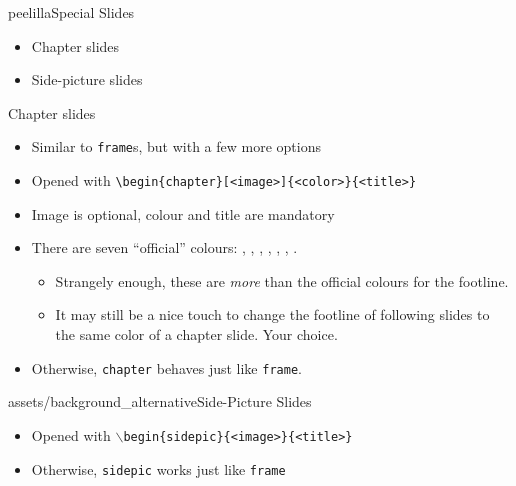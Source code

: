\begin{chapter}{peelilla}{Special Slides}
\begin{itemize}
    \item Chapter slides
    \item Side-picture slides
\end{itemize}
\end{chapter}


\begin{frame}[fragile]{Chapter slides}
\begin{itemize}
    \item Similar to \verb|frame|s, but with a few more options
    \item Opened with \verb|\begin{chapter}[<image>]{<color>}{<title>}|
    \item Image is optional, colour and title are mandatory
    \item There are seven ``official'' colours: , , , , , , .
    \begin{itemize}
        \item Strangely enough, these are \emph{more} than the official colours for the footline.
        \item It may still be a nice touch to change the footline of following  slides to the same color of a chapter slide. Your choice.
    \end{itemize}
    \item Otherwise, \verb|chapter| behaves just like \verb|frame|.
\end{itemize}
\end{frame}


\begin{sidepic}{assets/background_alternative}{Side-Picture Slides}
\begin{itemize}
    \item Opened with \texttt{$\backslash$begin\{sidepic\}\{<image>\}\{<title>\}}
    \item Otherwise, \texttt{sidepic} works just like \texttt{frame}
\end{itemize}
\end{sidepic}

